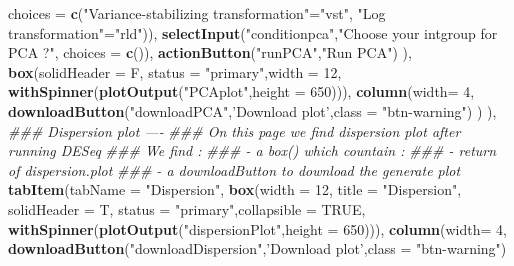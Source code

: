 \documentclass[
  12pt,
]{article}
\newenvironment{Shaded}{\begin{snugshade}}{\end{snugshade}}
\newcommand{\CommentTok}[1]{\textcolor[rgb]{0.56,0.35,0.01}{\textit{#1}}}
\newcommand{\DataTypeTok}[1]{\textcolor[rgb]{0.13,0.29,0.53}{#1}}
\newcommand{\DecValTok}[1]{\textcolor[rgb]{0.00,0.00,0.81}{#1}}
\newcommand{\KeywordTok}[1]{\textcolor[rgb]{0.13,0.29,0.53}{\textbf{#1}}}
\newcommand{\NormalTok}[1]{#1}
\newcommand{\OtherTok}[1]{\textcolor[rgb]{0.56,0.35,0.01}{#1}}
\newcommand{\StringTok}[1]{\textcolor[rgb]{0.31,0.60,0.02}{#1}}
\begin{document}
\begin{Shaded}
\begin{Highlighting}[]
                                    \DataTypeTok{choices =} \KeywordTok{c}\NormalTok{(}\StringTok{"Variance-stabilizing transformation"}\NormalTok{=}\StringTok{"vst"}\NormalTok{,}
                                                \StringTok{"Log transformation"}\NormalTok{=}\StringTok{"rld"}\NormalTok{)),}
                        \KeywordTok{selectInput}\NormalTok{(}\StringTok{"conditionpca"}\NormalTok{,}\StringTok{"Choose your intgroup for PCA ?"}\NormalTok{, }\DataTypeTok{choices =} \KeywordTok{c}\NormalTok{()),}
                        \KeywordTok{actionButton}\NormalTok{(}\StringTok{"runPCA"}\NormalTok{,}\StringTok{"Run PCA"}\NormalTok{)}
\NormalTok{                    ),}
                    \KeywordTok{box}\NormalTok{(}\DataTypeTok{solidHeader =}\NormalTok{ F, }\DataTypeTok{status =} \StringTok{"primary"}\NormalTok{,}\DataTypeTok{width =} \DecValTok{12}\NormalTok{,}
                        \KeywordTok{withSpinner}\NormalTok{(}\KeywordTok{plotOutput}\NormalTok{(}\StringTok{"PCAplot"}\NormalTok{,}\DataTypeTok{height =} \DecValTok{650}\NormalTok{))),}
                    \KeywordTok{column}\NormalTok{(}\DataTypeTok{width=} \DecValTok{4}\NormalTok{,}
                           \KeywordTok{downloadButton}\NormalTok{(}\StringTok{"downloadPCA"}\NormalTok{,}\StringTok{'Download plot'}\NormalTok{,}\DataTypeTok{class =} \StringTok{"btn-warning"}\NormalTok{)}
\NormalTok{                    )}
\NormalTok{            ),}
            \CommentTok{### Dispersion plot ----}
            \CommentTok{### On this page we find dispersion plot after running DESeq}
            \CommentTok{### We find :}
            \CommentTok{###     - a box() which countain :}
            \CommentTok{###         - return of dispersion.plot }
            \CommentTok{###     - a downloadButton to download  the generate plot}
            \KeywordTok{tabItem}\NormalTok{(}\DataTypeTok{tabName =} \StringTok{"Dispersion"}\NormalTok{,}
                    \KeywordTok{box}\NormalTok{(}\DataTypeTok{width =} \DecValTok{12}\NormalTok{,}
                        \DataTypeTok{title =} \StringTok{"Dispersion"}\NormalTok{, }\DataTypeTok{solidHeader =}\NormalTok{ T, }\DataTypeTok{status =} \StringTok{"primary"}\NormalTok{,}\DataTypeTok{collapsible =} \OtherTok{TRUE}\NormalTok{,}
                        \KeywordTok{withSpinner}\NormalTok{(}\KeywordTok{plotOutput}\NormalTok{(}\StringTok{"dispersionPlot"}\NormalTok{,}\DataTypeTok{height =} \DecValTok{650}\NormalTok{))),}
                    \KeywordTok{column}\NormalTok{(}\DataTypeTok{width=} \DecValTok{4}\NormalTok{,}
                           \KeywordTok{downloadButton}\NormalTok{(}\StringTok{"downloadDispersion"}\NormalTok{,}\StringTok{'Download plot'}\NormalTok{,}\DataTypeTok{class =} \StringTok{"btn-warning"}\NormalTok{)}

\end{Highlighting}
\end{Shaded}
\end{document}
